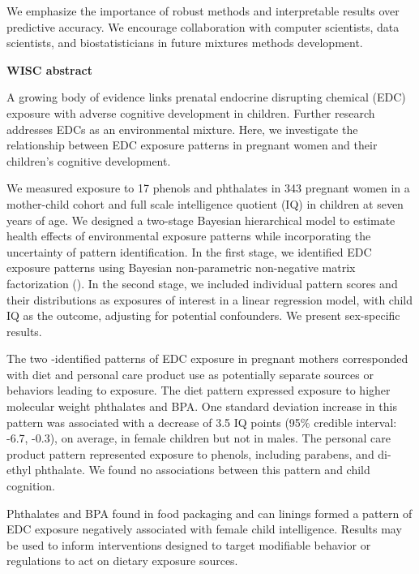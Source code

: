 We emphasize the importance of robust methods and interpretable results over predictive accuracy. We encourage collaboration with computer scientists, data scientists, and biostatisticians in future mixtures methods development.

\textbf{WISC abstract}

A growing body of evidence links prenatal endocrine disrupting chemical (EDC) exposure with adverse cognitive development in children. Further research addresses EDCs as an environmental mixture. Here, we investigate the relationship between EDC exposure patterns in pregnant women and their children's cognitive development.

We measured exposure to 17 phenols and phthalates in 343 pregnant women in a mother-child cohort and full scale intelligence quotient (IQ) in children at seven years of age. We designed a two-stage Bayesian hierarchical model to estimate health effects of environmental exposure patterns while incorporating the uncertainty of pattern identification. In the first stage, we identified EDC exposure patterns using Bayesian non-parametric non-negative matrix factorization (\bnmfc). In the second stage, we included individual pattern scores and their distributions as exposures of interest in a linear regression model, with child IQ as the outcome, adjusting for potential confounders. We present sex-specific results.

The two \bnmfc-identified patterns of EDC exposure in pregnant mothers corresponded with diet and personal care product use as potentially separate sources or behaviors leading to exposure. The diet pattern expressed exposure to higher molecular weight phthalates and BPA. One standard deviation increase in this pattern was associated with a decrease of 3.5 IQ points (95\% credible interval: -6.7, -0.3), on average, in female children but not in males. The personal care product pattern represented exposure to phenols, including parabens, and di-ethyl phthalate. We found no associations between this pattern and child cognition.

Phthalates and BPA found in food packaging and can linings formed a pattern of EDC exposure negatively associated with female child intelligence. Results may be used to inform interventions designed to target modifiable behavior or regulations to act on dietary exposure sources.

